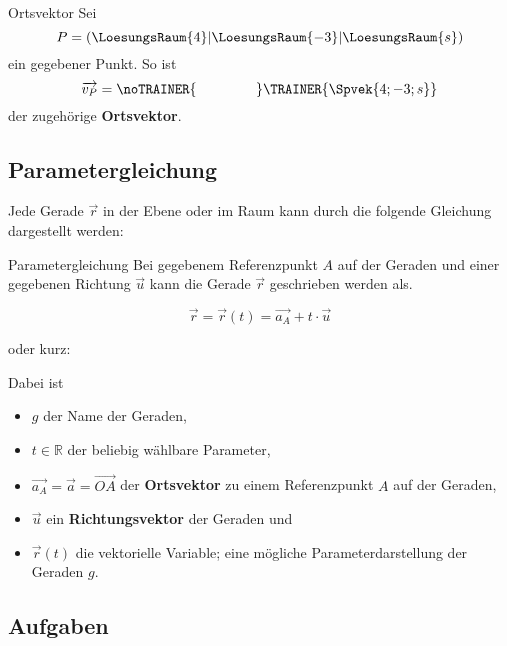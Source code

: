 \begin{beispiel}{Ortsvektor}{}
  Sei
  $$P=(\LoesungsRaum{4}|\LoesungsRaum{-3}|\LoesungsRaum{s})$$
  ein
gegebener Punkt. So ist
 $$\overrightarrow{v_P}
= \noTRAINER{\hspace{15mm}} \TRAINER{\Spvek{4;-3;s}}$$
der zugehörige \textbf{Ortsvektor}.
\end{beispiel}

\newpage
\subsection{Parametergleichung}
Jede Gerade $\vec{r}$ in der Ebene oder im Raum kann durch die
folgende Gleichung dargestellt werden:

\begin{definition}{Parametergleichung}{}
  Bei gegebenem Referenzpunkt $A$ auf der Geraden und einer gegebenen
  Richtung $\vec{u}$ kann die Gerade $\vec{r}$ geschrieben werden als.
  
  $$\vec{r} = \vec{r}(t) = \overrightarrow{a_A} + t\cdot{} \vec{u}$$

  oder kurz:

  \begin{center}\end{center}
  
  Dabei ist
  \begin{itemize}
    \item $g$ der Name der Geraden,
    \item $t\in\mathbb{R}$ der beliebig wählbare Parameter,
    \item $\overrightarrow{a_A} = \vec{a} = \overrightarrow{OA}$ der
      \textbf{Ortsvektor} zu einem Referenzpunkt $A$ auf der Geraden,
    \item $\vec{u}$ ein
      \textbf{Richtungsvektor} der Geraden und
    \item $\vec{r}(t)$ die vektorielle Variable; eine mögliche
      Parameterdarstellung der Geraden $g$.
  \end{itemize}
  
\end{definition}

\subsection*{Aufgaben}


\newpage%
